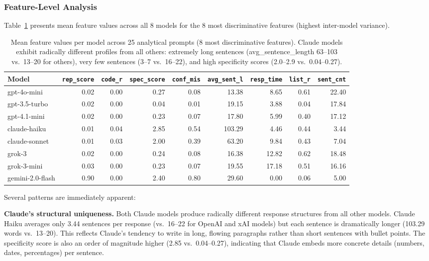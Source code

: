\documentclass[11pt,twocolumn]{article}
\begin{document}
\subsubsection{Feature-Level Analysis}

Table~\ref{tab:fingerprint_data} presents mean feature values across all 8 models for the 8 most discriminative features (highest inter-model variance).

\begin{table}[t]
\centering\small
\caption{Mean feature values per model across 25 analytical prompts (8 most discriminative features). Claude models exhibit radically different profiles from all others: extremely long sentences (avg\_sentence\_length 63--103 vs.\ 13--20 for others), very few sentences (3--7 vs.\ 16--22), and high specificity scores (2.0--2.9 vs.\ 0.04--0.27).}
\label{tab:fingerprint_data}
\begin{tabular}{lrrrrrrrr}
\toprule
\textbf{Model} & \texttt{rep\_score} & \texttt{code\_r} & \texttt{spec\_score} & \texttt{conf\_mis} & \texttt{avg\_sent\_l} & \texttt{resp\_time} & \texttt{list\_r} & \texttt{sent\_cnt} \\
\midrule
gpt-4o-mini & 0.02 & 0.00 & 0.27 & 0.08 & 13.38 & 8.65 & 0.61 & 22.40 \\
gpt-3.5-turbo & 0.02 & 0.00 & 0.04 & 0.01 & 19.15 & 3.88 & 0.04 & 17.84 \\
gpt-4.1-mini & 0.02 & 0.00 & 0.23 & 0.07 & 17.80 & 5.99 & 0.40 & 17.12 \\
claude-haiku & 0.01 & 0.04 & 2.85 & 0.54 & 103.29 & 4.46 & 0.44 & 3.44 \\
claude-sonnet & 0.01 & 0.03 & 2.00 & 0.39 & 63.20 & 9.84 & 0.43 & 7.04 \\
grok-3 & 0.02 & 0.00 & 0.24 & 0.08 & 16.38 & 12.82 & 0.62 & 18.48 \\
grok-3-mini & 0.03 & 0.00 & 0.23 & 0.07 & 19.55 & 17.18 & 0.51 & 16.16 \\
gemini-2.0-flash & 0.90 & 0.00 & 2.40 & 0.80 & 29.60 & 0.00 & 0.06 & 5.00 \\
\bottomrule
\end{tabular}
\end{table}

Several patterns are immediately apparent:

\textbf{Claude's structural uniqueness.}
Both Claude models produce radically different response structures from all other models.
Claude Haiku averages only 3.44 sentences per response (vs.\ 16--22 for OpenAI and xAI models) but each sentence is dramatically longer (103.29 words vs.\ 13--20).
This reflects Claude's tendency to write in long, flowing paragraphs rather than short sentences with bullet points.
The specificity score is also an order of magnitude higher (2.85 vs.\ 0.04--0.27), indicating that Claude embeds more concrete details (numbers, dates, percentages) per sentence.
\end{document}
